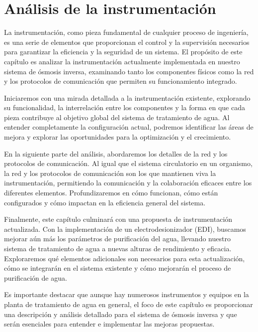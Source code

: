 \chapter{Análisis de la instrumentación}

La instrumentación, como pieza fundamental de cualquier proceso de ingeniería, es una serie de
elementos que proporcionan el control y la supervisión necesarios para garantizar la eficiencia y la
seguridad de un sistema. El propósito de este capítulo es analizar la instrumentación actualmente
implementada en nuestro sistema de ósmosis inversa, examinando tanto los componentes físicos
como la red y los protocolos de comunicación que permiten su funcionamiento integrado.

Iniciaremos con una mirada detallada a la instrumentación existente, explorando su funcionalidad,
la interrelación entre los componentes y la forma en que cada pieza contribuye al objetivo global del
sistema de tratamiento de agua. Al entender completamente la configuración actual, podremos identificar
las áreas de mejora y explorar las oportunidades para la optimización y el crecimiento.

En la siguiente parte del análisis, abordaremos los detalles de la red y los protocolos de
comunicación. Al igual que el sistema circulatorio en un organismo, la red y los protocolos de
comunicación son los que mantienen viva la instrumentación, permitiendo la comunicación y la colaboración
eficaces entre los diferentes elementos. Profundizaremos en cómo funcionan, cómo están configurados y
cómo impactan en la eficiencia general del sistema.

Finalmente, este capítulo culminará con una propuesta de instrumentación actualizada. Con la
implementación de un electrodesionizador (EDI), buscamos mejorar aún más los parámetros de purificación del agua,
llevando nuestro sistema de tratamiento de agua a nuevas alturas de rendimiento y eficacia. Exploraremos qué
elementos adicionales son necesarios para esta actualización, cómo se integrarán en el sistema existente y cómo
mejorarán el proceso de purificación de agua.

Es importante destacar que aunque hay numerosos instrumentos y equipos en la planta de tratamiento de agua en general,
el foco de este capítulo es proporcionar una descripción y análisis detallado  para el sistema
de ósmosis inversa y que serán esenciales para entender e implementar las mejoras propuestas.









